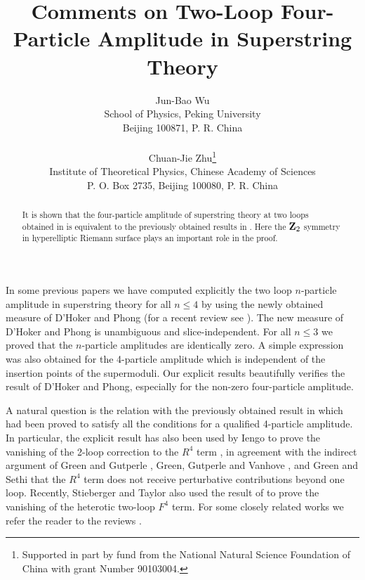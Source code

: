 \documentclass[a4paper,12pt]{article}
\begin{document}
\title{\bf Comments on Two-Loop Four-Particle Amplitude in
Superstring Theory}

\author{Jun-Bao Wu \\School of Physics, Peking University \\
Beijing 100871, P. R. China\\ \\
Chuan-Jie Zhu\thanks{Supported in
part by fund from the National Natural Science Foundation of China
with grant Number
90103004.} \\
Institute of Theoretical Physics,
Chinese Academy of Sciences\\
P. O. Box 2735,  Beijing 100080, P. R. China}

\maketitle


\begin{abstract}
It is shown that the four-particle amplitude of superstring theory
at two loops obtained in \cite{AllZhu1,AllZhu3} is equivalent to
the previously obtained results in \cite{IengoZhu2, IengoZhu3,
Zhu}. Here the ${\bf Z}_2$ symmetry in hyperelliptic Riemann
surface plays an important role in the proof.
\end{abstract}



In some previous papers \cite{AllZhu1, AllZhu3, AllZhu2} we have
computed explicitly the two loop $n$-particle amplitude in
superstring theory for all $n\le 4$ by using the newly obtained
measure of D'Hoker and Phong \cite{DHokerPhong2, DHokerPhong3,
DHokerPhong4, DHokerPhong5} (for a recent review see
\cite{DHokerPhong1, DHokerPhong6}). The new measure of D'Hoker and
Phong is unambiguous and slice-independent. For all $n\le 3$ we
proved that the $n$-particle amplitudes are identically zero. A
simple expression was also obtained for the 4-particle amplitude
which is independent of the insertion points of the supermoduli.
Our explicit results beautifully verifies the result of D'Hoker
and Phong, especially for the non-zero four-particle amplitude.

A natural question is the relation with the previously obtained
result in \cite{IengoZhu2, IengoZhu3, Zhu} which had been proved
to satisfy all the conditions for a qualified 4-particle
amplitude. In particular, the explicit result has also been used
by Iengo \cite{Iengo} to prove the vanishing of the 2-loop
correction to the $R^4$ term \cite{GrossWitten}, in agreement with
the indirect argument of Green and Gutperle \cite{GreenGutperle},
Green, Gutperle and Vanhove \cite{Green2}, and Green and Sethi
\cite{GreenSethi} that the $R^4$ term does not receive
perturbative contributions beyond one loop. Recently, Stieberger
and Taylor \cite{Stieberger}  also used the result of
\cite{IengoZhu2, IengoZhu3, Zhu} to prove the vanishing of the
heterotic two-loop $F^4$ term. For some closely related works we
refer the reader to the reviews \cite{Green3, Kiritsis}.
\end{document}
